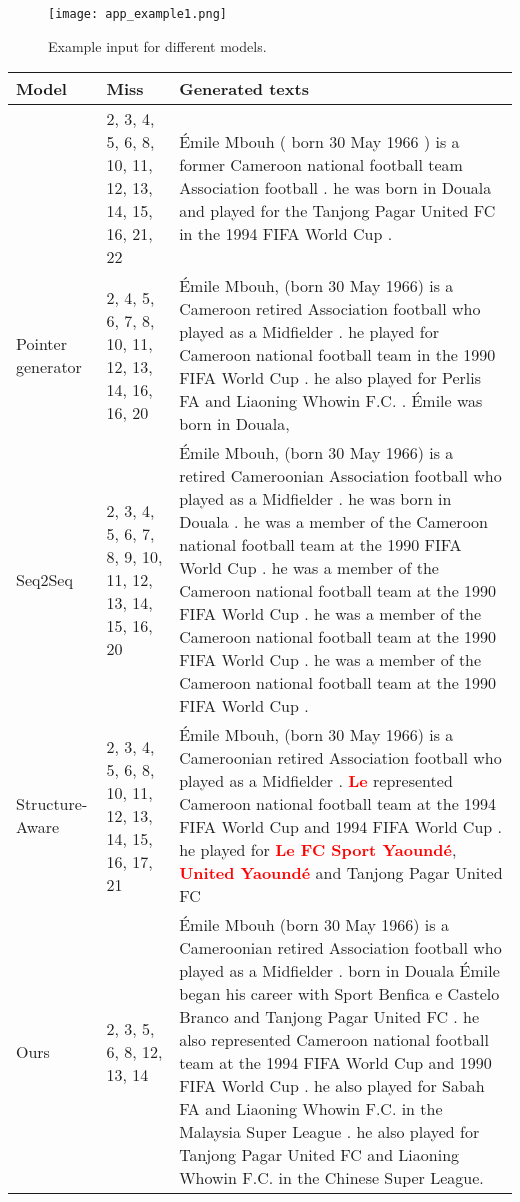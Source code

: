 \documentclass[11pt,a4paper]{article}
\begin{document}
\begin{figure*}
    \centering
    \texttt{[image: app\_example1.png]}
    \caption{Example input for different models.}
    \label{figapp:case_table1}
\end{figure*}




\begin{table*}[t]
    \centering
    \begin{tabularx}{\textwidth}{l|p{2.3cm}|X}
    \toprule
         Model & Miss & Generated texts\\ 
         \hline
          \cite{Wang2018} & \small{2, 3, 4, 5, 6,  8, 10, 11, 12, 13, 14, 15, 16, 21, 22}& \small{\'{E}mile Mbouh ( born 30 May 1966 ) is a former Cameroon national football team Association football . he was born in Douala and played for the Tanjong Pagar United FC in the 1994 FIFA World Cup .}\\
         \hline
         Pointer generator & \small{2, 4, 5, 6, 7, 8, 10, 11, 12, 13, 14, 16, 16, 20}& \small{\'{E}mile Mbouh, (born 30 May 1966) is a Cameroon retired Association football who played as a Midfielder . he played for Cameroon national football team in the 1990 FIFA World Cup . he also played for Perlis FA and Liaoning Whowin F.C. . \'{E}mile was born in Douala,} \\
         \hline
         Seq2Seq & \small{2, 3, 4, 5, 6, 7, 8, 9, 10, 11, 12, 13, 14, 15, 16, 20}& \small{\'{E}mile Mbouh, (born 30 May 1966) is a retired Cameroonian Association football who played as a Midfielder . he was born in Douala . he was a member of the Cameroon national football team at the 1990 FIFA World Cup . he was a member of the Cameroon national football team at the 1990 FIFA World Cup . he was a member of the Cameroon national football team at the 1990 FIFA World Cup . he was a member of the Cameroon national football team at the 1990 FIFA World Cup .}\\
         \hline
         Structure-Aware & \small{2, 3, 4, 5, 6, 8, 10, 11, 12, 13, 14, 15, 16, 17, 21 }& \small{\'{E}mile Mbouh, (born 30 May 1966) is a Cameroonian retired Association football who played as a Midfielder . \textcolor{red}{\textbf{Le}} represented Cameroon national football team at the 1994 FIFA World Cup and 1994 FIFA World Cup . he played for \textcolor{red}{\textbf{Le FC Sport Yaound\'{e}}}, \textcolor{red}{\textbf{United Yaound\'{e}}} and Tanjong Pagar United FC} \\
         \hline
         Ours & \small{2, 3, 5, 6, 8, 12, 13, 14 }& \small{\'{E}mile Mbouh (born 30 May 1966) is a Cameroonian retired Association football who played as a Midfielder . born in Douala \'{E}mile began his career with Sport Benfica e Castelo Branco and Tanjong Pagar United FC . he also represented Cameroon national football team at the 1994 FIFA World Cup and 1990 FIFA World Cup . he also played for Sabah FA and Liaoning Whowin F.C. in the Malaysia Super League . he also played for Tanjong Pagar United FC and Liaoning Whowin F.C. in the Chinese Super League.}\\

\end{tabularx}
\end{table*}
\end{document}
